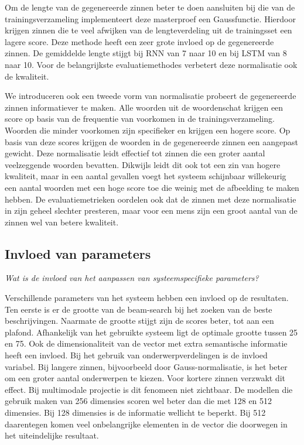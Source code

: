 Om de lengte van de gegenereerde zinnen beter te doen aansluiten bij die van de trainingsverzameling implementeert deze masterproef een Gaussfunctie. Hierdoor krijgen zinnen die te veel afwijken van de lengteverdeling uit de trainingsset een lagere score. 
Deze methode heeft een zeer grote invloed op de gegenereerde zinnen. De gemiddelde lengte stijgt bij RNN van 7 naar 10 en bij LSTM van 8 naar 10. Voor de belangrijkste evaluatiemethodes verbetert deze normalisatie ook de kwaliteit.

We introduceren ook een tweede vorm van normalisatie probeert de gegenereerde zinnen informatiever te maken. Alle woorden uit de woordenschat krijgen een score op basis van de frequentie van voorkomen in de trainingsverzameling. Woorden die minder voorkomen zijn specifieker en krijgen een hogere score. Op basis van deze scores krijgen de woorden in de gegenereerde zinnen een aangepast gewicht. Deze normalisatie leidt effectief tot zinnen die een groter aantal veelzeggende woorden bevatten. Dikwijls leidt dit ook tot een zin van hogere kwaliteit, maar in een aantal gevallen voegt het systeem schijnbaar willekeurig een aantal woorden met een hoge score toe die weinig met de afbeelding te maken hebben. De evaluatiemetrieken oordelen ook dat de zinnen met deze normalisatie in zijn geheel slechter presteren, maar voor een mens zijn een groot aantal van de zinnen wel van betere kwaliteit.

\subsection{Invloed van parameters}
\emph{Wat is de invloed van het aanpassen van systeemspecifieke parameters?}

Verschillende parameters van het systeem hebben een invloed op de resultaten. Ten eerste is er de grootte van de beam-search bij het zoeken van de beste beschrijvingen. Naarmate de grootte stijgt zijn de scores beter, tot aan een plafond. Afhankelijk van het gebruikte systeem ligt de optimale grootte tussen 25 en 75. Ook de dimensionaliteit van de vector met extra semantische informatie heeft een invloed. Bij het gebruik van onderwerpverdelingen is de invloed variabel. Bij langere zinnen, bijvoorbeeld door Gauss-normalisatie, is het beter om een groter aantal onderwerpen te kiezen. Voor kortere zinnen verzwakt dit effect. Bij multimodale projectie is dit fenomeen niet zichtbaar. De modellen die gebruik maken van 256 dimensies scoren wel beter dan die met 128 en 512 dimensies. Bij 128 dimensies is de informatie wellicht te beperkt. Bij 512 daarentegen komen veel onbelangrijke elementen in de vector die doorwegen in het uiteindelijke resultaat.

